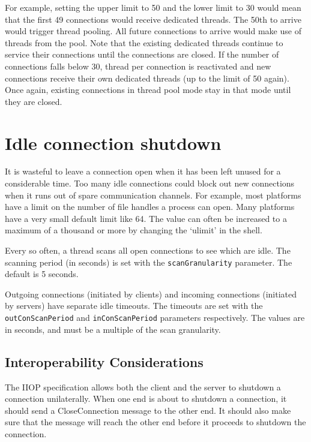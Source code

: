\documentclass[draft,11pt,twoside,a4paper]{book}
\newcommand{\code}[1]{\texttt{#1}}
\newcommand{\dsc}{\discretionary{}{}{}}
\begin{document}
For example, setting the upper limit to 50 and the lower limit to 30
would mean that the first 49 connections would receive dedicated
threads. The 50th to arrive would trigger thread pooling. All future
connections to arrive would make use of threads from the pool. Note
that the existing dedicated threads continue to service their
connections until the connections are closed. If the number of
connections falls below 30, thread per connection is reactivated and
new connections receive their own dedicated threads (up to the limit
of 50 again). Once again, existing connections in thread pool mode
stay in that mode until they are closed.


\section{Idle connection shutdown}
\label{sec:connShutdown}

It is wasteful to leave a connection open when it has been left unused
for a considerable time. Too many idle connections could block out new
connections when it runs out of spare communication channels. For
example, most platforms have a limit on the number of file handles a
process can open. Many platforms have a very small default limit like
64. The value can often be increased to a maximum of a thousand or
more by changing the `ulimit' in the shell.

Every so often, a thread scans all open connections to see which are
idle. The scanning period (in seconds) is set with the
\code{scanGranularity} parameter. The default is 5 seconds.

Outgoing connections (initiated by clients) and incoming connections
(initiated by servers) have separate idle timeouts.  The timeouts are
set with the \code{outConScan\dsc{}Period} and \code{inConScanPeriod}
parameters respectively. The values are in seconds, and must be a
multiple of the scan granularity.


\subsection{Interoperability Considerations}

The IIOP specification allows both the client and the server to
shutdown a connection unilaterally. When one end is about to shutdown
a connection, it should send a CloseConnection message to the other
end. It should also make sure that the message will reach the other
end before it proceeds to shutdown the connection.
\end{document}
